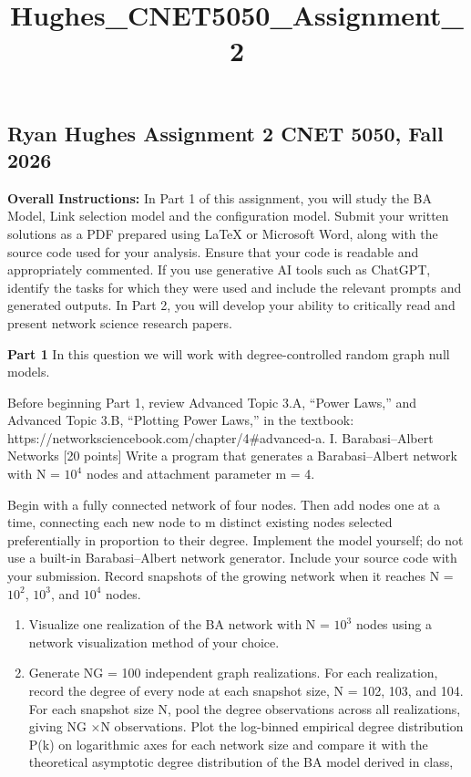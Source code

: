 \documentclass[11pt]{article}
\title{Hughes\_CNET5050\_Assignment\_2}
\begin{document}
    
    \maketitle
    
    

    
    \subsection{Ryan Hughes Assignment 2 CNET 5050, Fall
2026}\label{ryan-hughes-assignment-2-cnet-5050-fall-2026}

\textbf{Overall Instructions:} In Part 1 of this assignment, you will
study the BA Model, Link selection model and the configuration model.
Submit your written solutions as a PDF prepared using LaTeX or Microsoft
Word, along with the source code used for your analysis. Ensure that
your code is readable and appropriately commented. If you use generative
AI tools such as ChatGPT, identify the tasks for which they were used
and include the relevant prompts and generated outputs. In Part 2, you
will develop your ability to critically read and present network science
research papers.

\textbf{Part 1} In this question we will work with degree-controlled
random graph null models.

Before beginning Part 1, review Advanced Topic 3.A, ``Power Laws,'' and
Advanced Topic 3.B, ``Plotting Power Laws,'' in the textbook:
https://networksciencebook.com/chapter/4\#advanced-a. I.
Barabasi--Albert Networks {[}20 points{]} Write a program that generates
a Barabasi--Albert network with N = \(10^4\) nodes and attachment
parameter m = 4.

Begin with a fully connected network of four nodes. Then add nodes one
at a time, connecting each new node to m distinct existing nodes
selected preferentially in proportion to their degree. Implement the
model yourself; do not use a built-in Barabasi--Albert network
generator. Include your source code with your submission. Record
snapshots of the growing network when it reaches N = \(10^2\), \(10^3\),
and \(10^4\) nodes.

\begin{enumerate}
\def\labelenumi{(\alph{enumi})}
\item
  Visualize one realization of the BA network with N = \(10^3\) nodes
  using a network visualization method of your choice.
\item
  Generate NG = 100 independent graph realizations. For each
  realization, record the degree of every node at each snapshot size, N
  = 102, 103, and 104. For each snapshot size N, pool the degree
  observations across all realizations, giving NG ×N observations. Plot
  the log-binned empirical degree distribution P(k) on logarithmic axes
  for each network size and compare it with the theoretical asymptotic
  degree distribution of the BA model derived in class,
\end{enumerate}
\end{document}
